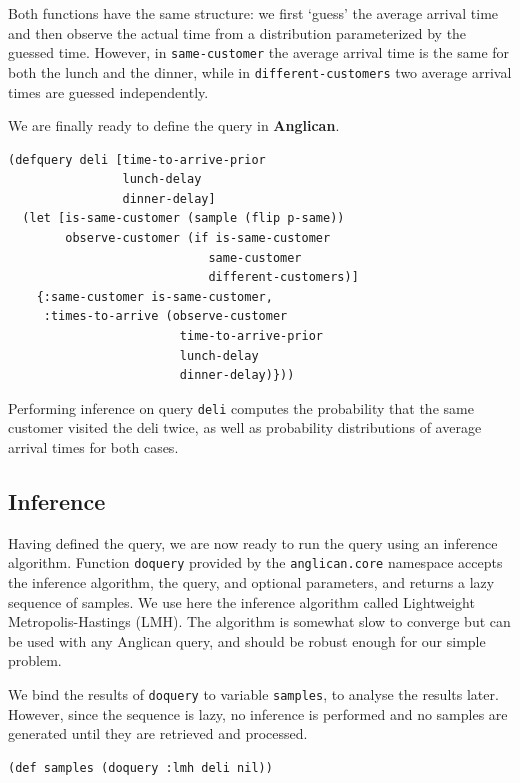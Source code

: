\documentclass[preprint]{sigplanconf}
\begin{document}
Both functions have the same structure: we first `guess' the
average arrival time and then observe the actual time from a
distribution parameterized by the guessed time. However, in
\texttt{same-customer} the average arrival time is the same for
both the lunch and the dinner, while in
\texttt{different-customers} two average arrival times are
guessed independently.

We are finally ready to define the query in \textbf{Anglican}.

\begin{lstlisting}[style=default]
(defquery deli [time-to-arrive-prior
                lunch-delay
                dinner-delay]
  (let [is-same-customer (sample (flip p-same))
        observe-customer (if is-same-customer
                            same-customer
                            different-customers)]
    {:same-customer is-same-customer,
     :times-to-arrive (observe-customer 
                        time-to-arrive-prior
                        lunch-delay
                        dinner-delay)}))
\end{lstlisting}

Performing inference on query \texttt{deli} computes the
probability that the same customer visited the deli twice, as
well as probability distributions of average arrival times for
both cases.

\subsection{Inference}
\label{seq:deli-inference}

Having defined the query, we are now ready to run the query
using an inference algorithm. Function \texttt{doquery} provided
by the \texttt{anglican.core} namespace accepts the inference
algorithm, the query, and optional parameters, and returns a
lazy sequence of samples. We use here the inference algorithm
called Lightweight Metropolis-Hastings (LMH). The algorithm is
somewhat slow to converge but can be used with any Anglican
query, and should be robust enough for our simple problem.

We bind the results of \texttt{doquery} to variable
\texttt{samples}, to analyse the results later. However, since
the sequence is lazy, no inference is performed and no samples
are generated until they are retrieved and processed.

\begin{lstlisting}[style=default]
(def samples (doquery :lmh deli nil))
\end{lstlisting}
\end{document}
